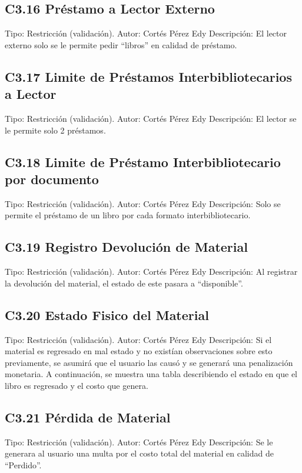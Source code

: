 \subsection{C3.16 Préstamo a Lector Externo}
	\UCli Tipo: Restricción (validación).
	\UCli Autor: Cortés Pérez Edy
	\UCli Descripción: El lector externo solo se le permite pedir “libros” en calidad de préstamo. 
	
\subsection{C3.17 Limite de Préstamos Interbibliotecarios a Lector}
	\UCli Tipo: Restricción (validación).
	\UCli Autor: Cortés Pérez Edy
	\UCli Descripción: El lector se le permite solo 2 préstamos.
	
\subsection{C3.18 Limite de Préstamo Interbibliotecario por documento}
	\UCli Tipo: Restricción (validación).
	\UCli Autor: Cortés Pérez Edy
	\UCli Descripción: Solo se permite el préstamo de un libro por cada formato interbibliotecario.
	
\subsection{C3.19 Registro Devolución de Material}
	\UCli Tipo: Restricción (validación).
	\UCli Autor: Cortés Pérez Edy
	\UCli Descripción: Al registrar la devolución del material, el estado de este pasara a “disponible”.
	
\subsection{C3.20 Estado Fisico del Material}
	\UCli Tipo: Restricción (validación).
	\UCli Autor: Cortés Pérez Edy
	\UCli Descripción: Si el material es regresado en mal estado y no existían observaciones sobre esto previamente, se asumirá que el usuario las causó y se generará una penalización monetaria. A continuación, se muestra una tabla describiendo el estado en que el libro es regresado y el costo que genera.
	
\subsection{C3.21 Pérdida de Material}
	\UCli Tipo: Restricción (validación).
	\UCli Autor: Cortés Pérez Edy
	\UCli Descripción: Se le generara al usuario una multa por el costo total del material en calidad de “Perdido”.
	
